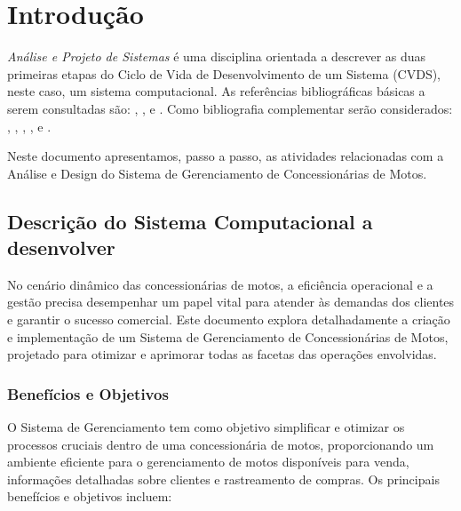 

\chapter{ Introdu\c{c}\~{a}o}

\textit{An\'{a}lise e Projeto de Sistemas} \'{e} uma disciplina orientada a descrever as duas primeiras etapas do Ciclo de Vida de Desenvolvimento de um Sistema (CVDS), neste caso, um sistema computacional.  As refer\^{e}ncias bibliogr\'{a}ficas b\'{a}sicas a serem consultadas s\~{a}o: \cite{Dennis2014}, \cite{Dennis2019},\cite{Gane1983} e \cite{Sommerville2011}. Como bibliografia complementar ser\~{a}o considerados: \cite{Satzinger2012}, \cite{Shelly2012}, \cite{Valacich2020}, \cite{Kendall2020}, \cite{Budgen2021} e \cite{Engholm2013}.

Neste documento apresentamos, passo a passo,  as atividades relacionadas com a An\'{a}lise e Design do Sistema de Gerenciamento de Concessionárias de Motos.


 \section{Descri\c{c}\~{a}o do Sistema Computacional a desenvolver}

No cenário dinâmico das concessionárias de motos, a eficiência operacional e a gestão precisa desempenhar um papel vital para atender às demandas dos clientes e garantir o sucesso comercial. Este documento explora detalhadamente a criação e implementação de um Sistema de Gerenciamento de Concessionárias de Motos, projetado para otimizar e aprimorar todas as facetas das operações envolvidas.

        \subsection{Benefícios e Objetivos} 
		O Sistema de Gerenciamento tem como objetivo simplificar e otimizar os processos cruciais dentro de uma concessionária de motos, proporcionando um ambiente eficiente para o gerenciamento de motos disponíveis para venda, informações detalhadas sobre clientes e rastreamento de compras. Os principais benefícios e objetivos incluem:
		
